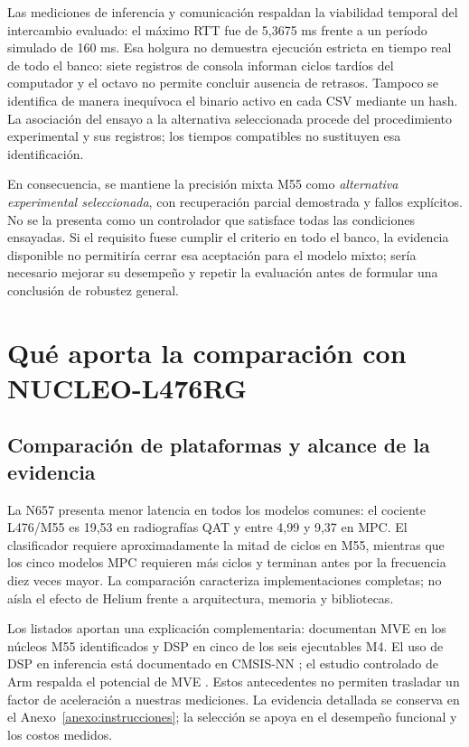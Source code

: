 Las mediciones de inferencia y comunicación respaldan la viabilidad temporal del intercambio evaluado: el máximo RTT fue de 5,3675 ms frente a un período simulado de 160 ms. Esa holgura no demuestra ejecución estricta en tiempo real de todo el banco: siete registros de consola informan ciclos tardíos del computador y el octavo no permite concluir ausencia de retrasos. Tampoco se identifica de manera inequívoca el binario activo en cada CSV mediante un hash. La asociación del ensayo a la alternativa seleccionada procede del procedimiento experimental y sus registros; los tiempos compatibles no sustituyen esa identificación.

En consecuencia, se mantiene la precisión mixta M55 como \emph{alternativa experimental seleccionada}, con recuperación parcial demostrada y fallos explícitos. No se la presenta como un controlador que satisface todas las condiciones ensayadas. Si el requisito fuese cumplir el criterio en todo el banco, la evidencia disponible no permitiría cerrar esa aceptación para el modelo mixto; sería necesario mejorar su desempeño y repetir la evaluación antes de formular una conclusión de robustez general.

\FloatBarrier
\section{Qué aporta la comparación con NUCLEO-L476RG}\label{sec:discusion_l476}
\subsection{Comparación de plataformas y alcance de la evidencia}
La N657 presenta menor latencia en todos los modelos comunes: el cociente L476/M55 es 19,53 en radiografías QAT y entre 4,99 y 9,37 en MPC. El clasificador requiere aproximadamente la mitad de ciclos en M55, mientras que los cinco modelos MPC requieren más ciclos y terminan antes por la frecuencia diez veces mayor. La comparación caracteriza implementaciones completas; no aísla el efecto de Helium frente a arquitectura, memoria y bibliotecas.

Los listados aportan una explicación complementaria: documentan MVE en los núcleos M55 identificados y DSP en cinco de los seis ejecutables M4. El uso de DSP en inferencia está documentado en CMSIS-NN \cite{lai2018}; el estudio controlado de Arm respalda el potencial de MVE \cite{res_helium2021}. Estos antecedentes no permiten trasladar un factor de aceleración a nuestras mediciones. La evidencia detallada se conserva en el Anexo~\ref{anexo:instrucciones}; la selección se apoya en el desempeño funcional y los costos medidos.

